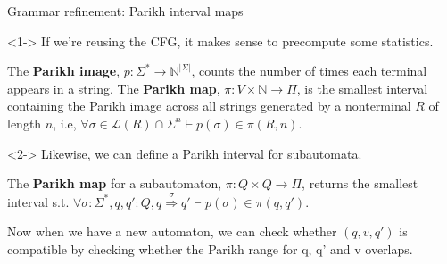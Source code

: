 \documentclass{beamer}
\begin{document}
\begin{frame}[t,fragile]{Grammar refinement: Parikh interval maps}
  \begin{onlyenv}<1->
  \vspace{-0.1cm}If we’re reusing the CFG, it makes sense to precompute some statistics.


  \begin{definition}
    The \textbf{Parikh image}, $p: \Sigma^* \rightarrow \mathbb{N}^{|\Sigma|}$, counts the number of times each terminal appears in a string. The \textbf{Parikh map}, $\pi: V \times \mathbb{N} \rightarrow \Pi$, is the smallest interval containing the Parikh image across all strings generated by a nonterminal $R$ of length $n$, i.e, $\forall \sigma \in \mathcal{L}(R) \cap \Sigma^n \vdash p(\sigma) \in \pi(R, n)$.
  \end{definition}
  \end{onlyenv}
  \begin{onlyenv}<2->
  Likewise, we can define a Parikh interval for subautomata.

  \begin{definition}
    The \textbf{Parikh map} for a subautomaton, $\pi: Q \times Q \rightarrow \Pi$, returns the smallest interval s.t. $\forall \sigma: \Sigma^*, q, q': Q, q \overset{\sigma}{\Longrightarrow} q' \vdash p(\sigma) \in \pi(q, q')$.
  \end{definition}


  Now when we have a new automaton, we can check whether $(q, v, q')$ is compatible by checking whether the Parikh range for q, q’ and v overlaps.\\\vspace{0.5cm}

  \end{onlyenv}
\end{frame}
\end{document}
